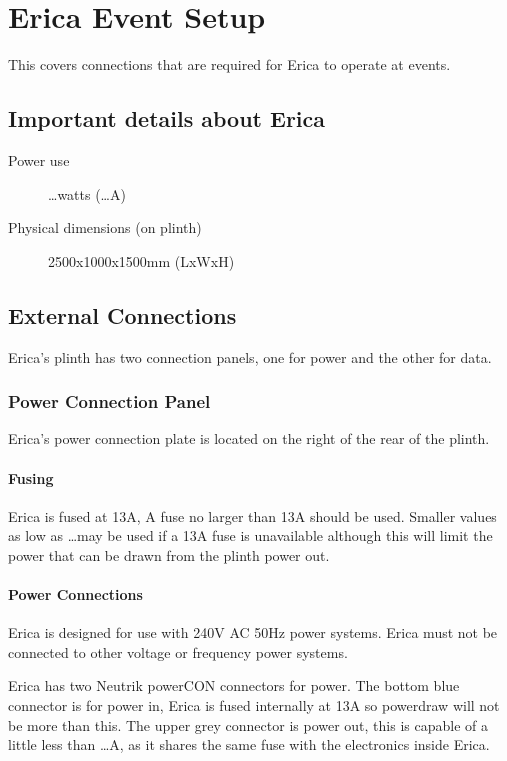 \chapter{Erica Event Setup}
This covers connections that are required for Erica to operate at events.

\section{Important details about Erica}
\begin{description}
	\item[Power use]{\dots watts (\dots A)}
	\item[Physical dimensions (on plinth)]{2500x1000x1500mm (LxWxH)}
\end{description}


\section{External Connections}
Erica's plinth has two connection panels, one for power and the other for data.


\subsection{Power Connection Panel}
Erica's power connection plate is located on the right of the rear of the plinth.


\subsubsection{Fusing}
Erica is fused at 13A, A fuse no larger than 13A should be used. Smaller values as low as \dots may be used if a 13A fuse is unavailable although this will limit the power that can be drawn from the plinth power out.


\subsubsection{Power Connections}
Erica is designed for use with 240V AC 50Hz power systems. Erica must not be connected to other voltage or frequency power systems. 

Erica has two Neutrik powerCON connectors for power. The bottom blue connector is for power in, Erica is fused internally at 13A so powerdraw will not be more than this.  The upper grey connector is power out, this is capable of a little less than \dots A, as it shares the same fuse with the electronics inside Erica.


